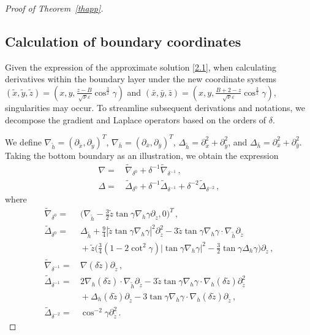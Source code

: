\documentclass[pdflatex,sn-mathphys-num]{sn-jnl}%
\theoremstyle{thmstyleone}%
\theoremstyle{thmstyletwo}%
\theoremstyle{thmstylethree}%
\theoremstyle{thmstyletwo}
\begin{document}
\begin{proof}[Proof of Theorem~{\upshape\ref{thapp}}]
\subsection{Calculation of boundary coordinates}\label{subsec2.1}
Given the expression of the approximate solution \eqref{2.1}, when calculating derivatives within the boundary layer under the new coordinate systems $(\tilde x,\tilde y,\tilde z)=(x,y,\frac{z - B}{\sqrt{\nu}\varepsilon}\cos^{\frac{3}{2}}\gamma)$ and $(\bar x,\bar y,\bar z)=(x,y,\frac{B + 2 - z}{\sqrt{\nu}\varepsilon}\cos^{\frac{3}{2}}\gamma)$, singularities may occur. To streamline subsequent derivations and notations, we decompose the gradient and Laplace operators based on the orders of $\delta$.



We define $\nabla_{\tilde{h}}=(\partial_{\tilde{x}},\partial_{\tilde{y}})^T$, $\nabla_{\bar{h}}=(\partial_{\bar{x}},\partial_{\bar{y}})^T$, $\Delta_{\tilde{h}}=\partial^2_{\tilde{x}}+\partial^2_{\tilde{y}}$, and $\Delta_{\bar{h}}=\partial^2_{\bar{x}}+\partial^2_{\bar{y}}$. Taking the bottom boundary as an illustration, we obtain the expression
\begin{align}
	\nabla=\,
	&\tilde{\nabla}_{\delta^{0}}
	+\delta^{-1}\tilde{\nabla}_{\delta^{-1}}\,,\label{2.4}\\
	\Delta=\,
	&\tilde{\Delta}_{\delta^{0}}
	+\delta^{-1}\tilde{\Delta}_{\delta^{-1}}
	+\delta^{-2}\tilde{\Delta}_{\delta^{-2}}\,,\label{2.5}
\end{align}
where
\begin{align*}
	\tilde{\nabla}_{\delta^{0}}=&
	\,\big(\nabla_{\tilde{h}}-\tfrac{3}{2}\tilde{z}\tan\gamma\nabla_{h}\gamma\partial_{\tilde{z}},0\big)^T\,,\\	
	\tilde{\Delta}_{\delta^{0}}
	=&\,\Delta_{\tilde{h}}+\tfrac{9}{4}|\tilde{z}\tan\gamma\nabla_{h}\gamma|^2\partial_{\tilde{z}}^2
	-3\tilde{z}
	\tan\gamma\nabla_{h}\gamma\cdot\nabla_{\tilde h}\partial_{\tilde{z}}
	\\
	& \,
	+\tilde{z}\big(\tfrac{3}{4}(1-2\cot^2\gamma)|\tan\gamma\nabla_{h}\gamma|^2
	-\tfrac{3}{2}\tan\gamma\Delta_h\gamma
	\big)\partial_{\tilde{z}}
	\,,\\
	\tilde{\nabla}_{\delta^{-1}}=&
	\,
	\nabla(\delta\tilde{z})\partial_{\tilde{z}}\,,\\
	\tilde{\Delta}_{\delta^{-1}}=&
	\,
	2\nabla_h(\delta\tilde{z})\cdot\nabla_{\tilde{h}}
	\partial_{\tilde{z}}
	-3\tilde{z}\tan\gamma\nabla_{h}\gamma\cdot\nabla_{h}(\delta\tilde{z})
	\partial^2_{\tilde{z}}\\
	&	\,+\Delta_h(\delta\tilde{z})\partial_{\tilde{z}}
	-3\tan\gamma\nabla_{h}\gamma\cdot\nabla_{h}(\delta\tilde{z})
	\partial_{\tilde{z}}
	\,,\\
	\tilde{\Delta}_{\delta^{-2}}=&
	\,\cos^{-2}\gamma\partial^2_{\tilde{z}}\,.
\end{align*}




\end{proof}
\end{document}
